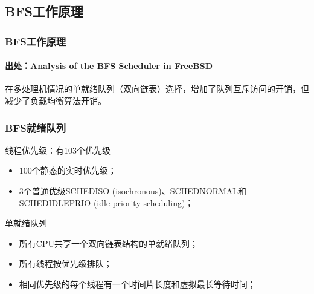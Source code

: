 \subsection{BFS工作原理} %
\begin{frame}[fragile]
    \frametitle{BFS工作原理}
    \framesubtitle{出处：\href{http://vellvisher.github.io/papers_reports/doc/BFS_FreeBSD.pdf}{Analysis of the BFS Scheduler in FreeBSD}}
    \begin{figure}
    \end{figure} \pause

在多处理机情况的单就绪队列（双向链表）选择，增加了队列互斥访问的开销，但减少了负载均衡算法开销。

\end{frame}
% 
% 
% 
% 
% 
% 
% 
\begin{frame}[fragile]
    \frametitle{BFS就绪队列}
    \begin{block}{线程优先级：有103个优先级}
	    \begin{itemize}
	        \item 100个静态的实时优先级；
	        \item 3个普通优级SCHEDISO (isochronous)、SCHEDNORMAL和SCHEDIDLEPRIO (idle priority scheduling)；
	    \end{itemize}
    \end{block} \pause
    \begin{block}{单就绪队列}
	    \begin{itemize}
	        \item 所有CPU共享一个双向链表结构的单就绪队列；
	        \item 所有线程按优先级排队；
	        \item 相同优先级的每个线程有一个时间片长度和虚拟最长等待时间；
	    \end{itemize}
    \end{block}
\end{frame}
% 
% 

